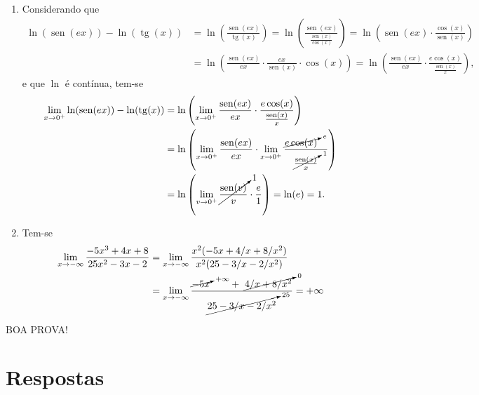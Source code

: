 \documentclass[12pt,a4paper]{article}
\newcommand*\sen{\operatorname{sen}}
\newcommand*\tg{\operatorname{tg}}
\begin{document}
\begin{ExerciseList}
\begin{enumerate}
\item Considerando que
\begin{align*}
\ln( \sen(e x) ) - \ln(\tg(x))
& = \ln\left( \frac{ \sen(e x) }{ \tg(x) }\right)
  = \ln\left(
    \frac{ \sen(e x) }
         { \frac{\sen(x)}{\cos(x)} }\right)
  = \ln\left( \sen(e x) \cdot
    \frac{ \cos(x) }
         { \sen(x) } \right)\\
& = \ln\left(
    \frac{ \sen(e x) }
         { ex } \cdot
    \frac{ ex }
         { \sen(x) } \cdot
    \cos(x) \right)
  = \ln\left(
    \frac{ \sen(e x) }
         { ex } \cdot
    \frac{ e \cos(x) }
         {\frac{ \sen(x) }
               { x }  }
     \right),
\end{align*}
e que $\ln$ é contínua, tem-se
\begin{align*}
\lim_{ x \to 0^+ } \ln( \sen(e x) ) - \ln(\tg(x))
& = \ln\left( \lim_{ x \to 0^+ }
    \frac{ \sen(e x) }
         { ex } \cdot
    \frac{ e \cos(x)}
         {\frac{ \sen(x) }
               { x }  }
    \right) \\
& = \ln\left(
    \lim_{ x \to 0^+ } \frac{ \sen(e x) }
         { ex } \cdot
    \lim_{ x \to 0^+ }
         \frac{ \cancelto{e}{ e \cos(x)} \quad }
              { \cancelto{1}{ \frac{ \sen(x) }
                    { x }} }
     \right) \\
& = \ln\left(
    \lim_{ v \to 0^+ }
         \cancelto{1}{ \frac{ \sen(v) }
                     { v }} \cdot
         \frac{ e }
              { 1 }\right)
  = \ln(e) = 1.
\end{align*}

\item Tem-se
\begin{align*}
\lim_{ x \to -\infty } \dfrac{ -5x^3 + 4x + 8}
                             { 25x^2 - 3x - 2}
& = \lim_{ x \to -\infty }
    \dfrac{ x^2(-5x + 4/x + 8/x^2)}
          { x^2( 25 - 3/x - 2/x^2)} \\
& = \lim_{ x \to -\infty }
    \dfrac{\cancelto{+\infty}{-5x}\qquad+\ \cancelto{0}{4/x + 8/x^2}}
          {\cancelto{25}{25 - 3/x - 2/x^2}}
  = +\infty
\end{align*}
\end{enumerate}
\end{ExerciseList}

\begin{center}
BOA PROVA!
\end{center}

\newpage
\restoregeometry
\section*{Respostas}
\shipoutAnswer
\end{document}
